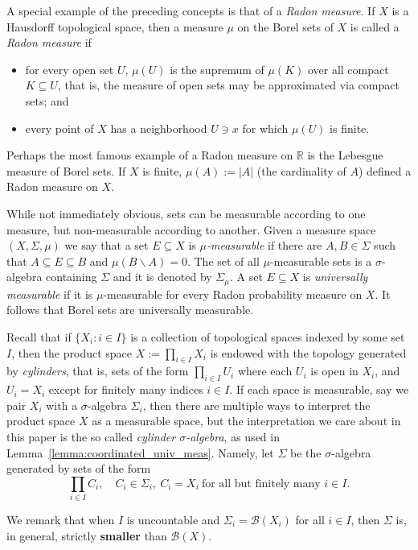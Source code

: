 \documentclass[psamsfonts]{amsart}
\theoremstyle{definition}
\theoremstyle{remark}
\numberwithin{equation}{section}
\begin{document}
A special example of the preceding concepts is that of a \emph{Radon measure}. If $X$ is a Hausdorff topological space, then a measure $\mu$ on the Borel sets of $X$ is called a \emph{Radon measure} if
\begin{itemize}
    \item for every open set $U$, $\mu(U)$ is the supremum of $\mu(K)$ over all compact $K\subseteq U$, that is, the measure of open sets may be approximated via compact sets; and
    \item every point of $X$ has a neighborhood $U\ni x$ for which $\mu(U)$ is finite.
\end{itemize}

Perhaps the most famous example of a Radon measure on $\mathbb R$ is the Lebesgue measure of Borel sets. If $X$ is finite, $\mu(A):=|A|$ (the cardinality of $A$) defined a Radon measure on $X$.

While not immediately obvious, sets can be measurable according to one measure, but non-measurable according to another. Given a measure space $(X,\Sigma,\mu)$ we say that a set $E\subseteq X$ is \emph{$\mu$-measurable} if there are $A,B\in \Sigma$ such that $A\subseteq E\subseteq B$ and $\mu(B\backslash A)=0$. The set of all $\mu$-measurable sets is a $\sigma$-algebra containing $\Sigma$ and it is denoted by $\Sigma_\mu$. A set $E\subseteq X$ is \emph{universally measurable} if it is $\mu$-measurable for every Radon probability measure on $X$. It follows that Borel sets are universally measurable.

Recall that if $\{X_i:i\in I\}$ is a collection of topological spaces indexed by some set $I$, then the product space $X:=\prod_{i\in I}X_i$ is endowed with the topology generated by \emph{cylinders}, that is, sets of the form $\prod_{i\in I} U_i$ where each $U_i$ is open in $X_i$, and $U_i=X_i$ except for finitely many indices $i\in I$. If each space is measurable, say we pair $X_i$ with a $\sigma$-algebra $\Sigma_i$, then there are multiple ways to interpret the product space $X$ as a measurable space, but the interpretation we care about in this paper is the so called \emph{cylinder $\sigma$-algebra}, as used in Lemma~\ref{lemma:coordinated_univ_meas}. Namely, let $\Sigma$ be the $\sigma$-algebra generated by sets of the form $$\prod_{i\in I}C_i,\quad C_i\in\Sigma_i,\ C_i=X_i\ \text{for all but finitely many }i\in I.$$

We remark that when $I$ is uncountable and $\Sigma_i=\mathcal B(X_i)$ for all $i\in I$, then $\Sigma$ is, in general, strictly \textbf{smaller} than $\mathcal B(X)$.
\end{document}
